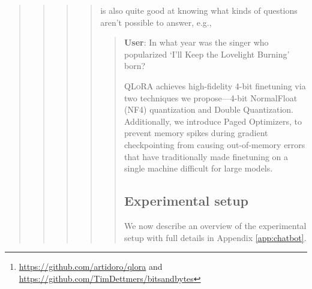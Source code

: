 \begin{quote}
\begin{quote}
\begin{quote}
\begin{quote}
 is also quite good at knowing what kinds of questions aren't possible to answer, e.g.,

\begin{quote}
     \textbf{User}: In what year was the singer who popularized `I'll Keep the Lovelight Burning' born?  

\textsc{QLoRA} achieves high-fidelity 4-bit finetuning via two techniques we propose—4-bit NormalFloat (NF4) quantization and Double Quantization. Additionally, we introduce Paged Optimizers, to prevent memory spikes during gradient checkpointing from causing out-of-memory errors that have traditionally made finetuning on a single machine difficult for large models.

\subsection{Experimental setup} We now describe an overview of the experimental setup with full details in Appendix \ref{app:chatbot}. 


\begin{abstract}
We present \textsc{QLoRA}, an efficient finetuning approach that reduces memory usage enough to finetune a 65B parameter model on a single 48GB GPU while preserving full 16-bit finetuning task performance. \textsc{QLoRA} backpropagates gradients through a frozen, 4-bit quantized pretrained language model into Low Rank Adapters~(LoRA). Our best model family, which we name \textbf{Guanaco}, outperforms all previous openly released models on the Vicuna benchmark, reaching 99.3\% of the performance level of ChatGPT while only requiring 24 hours of finetuning on a single GPU. \textsc{QLoRA} introduces a number of innovations to save memory without sacrificing performance: (a) 4-bit NormalFloat (NF4), a new data type that is information theoretically optimal for normally distributed weights (b) Double Quantization to reduce the average memory footprint by quantizing the quantization constants, and (c) Paged Optimizers to manage memory spikes. We use \textsc{QLoRA} to finetune more than 1,000 models, providing a detailed analysis of instruction following and chatbot performance across 8 instruction datasets, multiple model types (LLaMA, T5), and model scales that would be infeasible to run with regular finetuning (e.g. 33B and 65B parameter models). Our results show that QLoRA finetuning on a small high-quality dataset leads to state-of-the-art results, even when using smaller models than the previous SoTA. We provide a detailed analysis of chatbot performance based on both human and GPT-4 evaluations showing that GPT-4 evaluations are a cheap and reasonable alternative to human evaluation. Furthermore, we find that current chatbot benchmarks are not trustworthy to accurately evaluate the performance levels of chatbots. A lemon-picked analysis demonstrates where \textbf{Guanaco} fails compared to ChatGPT. We release all of our models and code, including CUDA kernels for 4-bit training.\footnote{\url{https://github.com/artidoro/qlora} and \url{https://github.com/TimDettmers/bitsandbytes}}
\end{abstract}


\end{quote}
\end{quote}
\end{quote}
\end{quote}
\end{quote}
